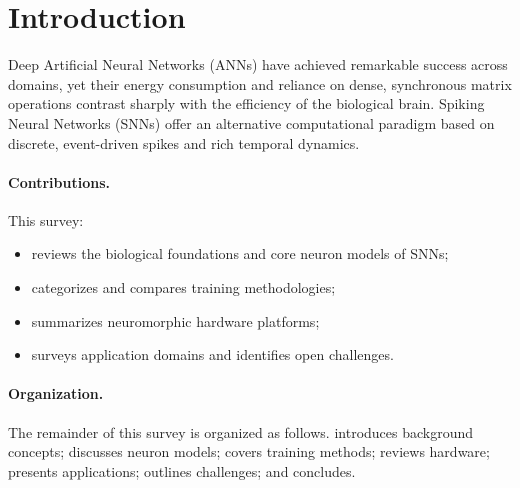\section{Introduction}
\label{sec:introduction}


Deep Artificial Neural Networks (ANNs) have achieved remarkable success across
domains, yet their energy consumption and reliance on dense, synchronous
matrix operations contrast sharply with the efficiency of the biological
brain. Spiking Neural Networks (SNNs) offer an alternative computational
paradigm based on discrete, event-driven spikes and rich temporal dynamics.

\paragraph{Contributions.} This survey:
\begin{itemize}[leftmargin=*]
  \item reviews the biological foundations and core neuron models of SNNs;
  \item categorizes and compares training methodologies;
  \item summarizes neuromorphic hardware platforms;
  \item surveys application domains and identifies open challenges.
\end{itemize}

\paragraph{Organization.} The remainder of this survey is organized as follows.
 introduces background concepts;
 discusses neuron models;
 covers training methods;
 reviews hardware;
 presents applications;
 outlines challenges; and
 concludes.

